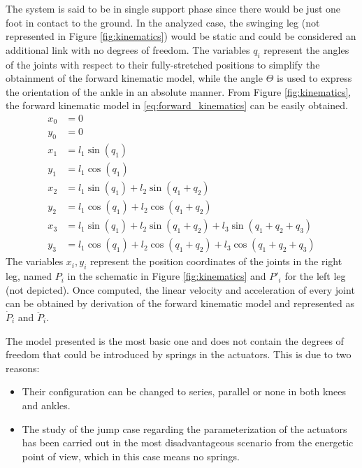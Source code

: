 The system is said to be in single support phase since there would be just one foot in contact to the ground.
In the analyzed case, the swinging leg (not represented in Figure \ref{fig:kinematics}) would be static and could be considered an additional link with no degrees of freedom.
The variables $q_{i}$ represent the angles of the joints with respect to their fully-stretched positions to simplify the obtainment of the forward kinematic model, while the angle $\Theta$ is used to express the orientation of the ankle in an absolute manner. 
From Figure \ref{fig:kinematics}, the forward kinematic model in \ref{eq:forward_kinematics} can be easily obtained.
\begin{equation}
\label{eq:forward_kinematics}
	\begin{aligned}
		x_{0} &= 0 \\
		y_{0} &= 0 \\
		x_{1} &= l_{1} \sin(q_{1}) \\
		y_{1} &= l_{1} \cos(q_{1}) \\
		x_{2} &= l_{1} \sin(q_{1}) + l_{2} \sin(q_{1}+q_{2}) \\
		y_{2} &= l_{1} \cos(q_{1}) + l_{2} \cos(q_{1}+q_{2}) \\
		x_{3} &= l_{1} \sin(q_{1}) + l_{2} \sin(q_{1}+q_{2}) + l_{3} \sin(q_{1}+q_{2}+q_{3}) \\
		y_{3} &= l_{1} \cos(q_{1}) + l_{2} \cos(q_{1}+q_{2}) + l_{3} \cos(q_{1}+q_{2}+q_{3}) 
	\end{aligned}
\end{equation}
The variables $x_{i}, y_{i}$ represent the position coordinates of the joints in the right leg, named $P_{i}$ in the schematic in Figure \ref{fig:kinematics} and $P'_{i}$ for the left leg (not depicted).
Once computed, the linear velocity and acceleration of every joint can be obtained by derivation of the forward kinematic model and represented as $\dot{P}_{i}$ and $\ddot{P}_{i}$.

The model presented is the most basic one and does not contain the degrees of freedom that could be introduced by springs in the actuators.
This is due to two reasons:
\begin{itemize}
	\item Their configuration can be changed to series, parallel or none in both knees and ankles.
	\item The study of the jump case regarding the parameterization of the actuators has been carried out in the most disadvantageous scenario from the energetic point of view, which in this case means no springs.
\end{itemize}


